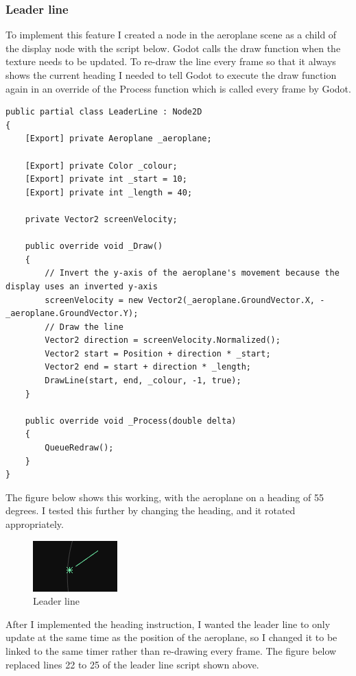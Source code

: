 \documentclass{article}
\begin{document}
\subsubsection{Leader line}\label{leaderline}
To implement this feature I created a node in the aeroplane scene as a child of the display node with the script below.
Godot calls the draw function when the texture needs to be updated.
To re-draw the line every frame so that it always shows the current heading I needed to tell Godot to execute the draw function again in an override of the Process function which is called every frame by Godot.
\lstset{style=csharp}
\begin{lstlisting}[caption=Leader line script]
public partial class LeaderLine : Node2D
{
    [Export] private Aeroplane _aeroplane;

    [Export] private Color _colour;
    [Export] private int _start = 10;
    [Export] private int _length = 40;

    private Vector2 screenVelocity;

    public override void _Draw()
    {
        // Invert the y-axis of the aeroplane's movement because the display uses an inverted y-axis
        screenVelocity = new Vector2(_aeroplane.GroundVector.X, -_aeroplane.GroundVector.Y);
        // Draw the line
        Vector2 direction = screenVelocity.Normalized();
        Vector2 start = Position + direction * _start;
        Vector2 end = start + direction * _length;
        DrawLine(start, end, _colour, -1, true);
    }

    public override void _Process(double delta)
    {
        QueueRedraw();
    }
}
\end{lstlisting}

The figure below shows this working, with the aeroplane on a heading of 55 degrees. I tested this further by changing the heading, and it rotated appropriately.
\begin{figure}[H]
\centering
\includegraphics[]{screenshots/leaderline.png}
\caption{\label{fig:leaderline}Leader line}
\end{figure}

After I implemented the heading instruction, I wanted the leader line to only update at the same time as the position of the aeroplane, so I changed it to be linked to the same timer rather than re-drawing every frame. The figure below replaced lines 22 to 25 of the leader line script shown above.
\end{document}
